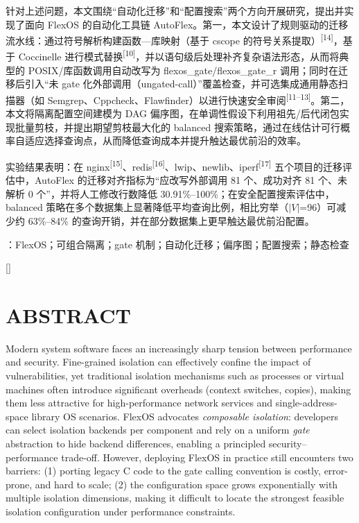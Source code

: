 \documentclass[UTF8,a4paper,12pt]{ctexart}
\numberwithin{equation}{section}
\renewcommand\thesection{\arabic{section}}
\newcommand{\timesnewroman}{\setmainfont[Path=Font/]{times}}
\begin{document}
针对上述问题，本文围绕``自动化迁移''和``配置搜索''两个方向开展研究，提出并实现了面向
FlexOS 的自动化工具链
AutoFlex。第一，本文设计了规则驱动的迁移流水线：通过符号解析构建函数---库映射（基于
cscope 的符号关系提取）\textsuperscript{[14]}，基于 Coccinelle
进行模式替换\textsuperscript{[10]}，并以语句级后处理补齐复杂语法形态，从而将典型的
POSIX/库函数调用自动改写为 flexos\_gate/flexos\_gate\_r
调用；同时在迁移后引入``未 gate
化外部调用（ungated-call）''覆盖检查，并可选集成通用静态扫描器（如
Semgrep、Cppcheck、Flawfinder）以进行快速安全审阅\textsuperscript{[11--13]}。第二，本文将隔离配置空间建模为
DAG
偏序图，在单调性假设下利用祖先/后代闭包实现批量剪枝，并提出期望剪枝最大化的
balanced
搜索策略，通过在线估计可行概率自适应选择查询点，从而降低查询成本并提升触达最优前沿的效率。

实验结果表明：在
nginx\textsuperscript{[15]}、redis\textsuperscript{[16]}、lwip、newlib、iperf\textsuperscript{[17]}
五个项目的迁移评估中，AutoFlex 的迁移对齐指标为``应改写外部调用 81
个、成功对齐 81 个、未解析 0 个''，并将人工修改行数降低
30.91\%--100\%；在安全配置搜索评估中，balanced
策略在多个数据集上显著降低平均查询比例，相比穷举（$|V|$=96）可减少约
63\%--84\% 的查询开销，并在部分数据集上更早触达最优前沿配置。

：FlexOS；可组合隔离；gate
机制；自动化迁移；偏序图；配置搜索；静态检查


\newpage
{}

\titleformat{\section}[block]{\centering\bfseries\timesnewroman\fontsize{16pt}{20pt}\selectfont}{\thesection}{1em}{}[]

\section*{ABSTRACT}
Modern system software faces an increasingly sharp tension between
performance and security. Fine-grained isolation can effectively confine
the impact of vulnerabilities, yet traditional isolation mechanisms such
as processes or virtual machines often introduce significant overheads
(context switches, copies), making them less attractive for
high-performance network services and single-address-space library OS
scenarios. FlexOS advocates \emph{composable isolation}: developers can
select isolation backends per component and rely on a uniform
\emph{gate} abstraction to hide backend differences, enabling a
principled security--performance trade-off. However, deploying FlexOS in
practice still encounters two barriers: (1) porting legacy C code to the
gate calling convention is costly, error-prone, and hard to scale; (2)
the configuration space grows exponentially with multiple isolation
dimensions, making it difficult to locate the strongest feasible
isolation configuration under performance constraints.
\end{document}
